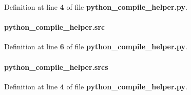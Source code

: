 Definition at line {\bf 4} of file {\bf python\+\_\+compile\+\_\+helper.\+py}.

\paragraph[{src}]{\setlength{\rightskip}{0pt plus 5cm}python\+\_\+compile\+\_\+helper.\+src}\label{namespacepython__compile__helper_afb3a73f20726fb31e2a57e2aee904087}


Definition at line {\bf 6} of file {\bf python\+\_\+compile\+\_\+helper.\+py}.

\paragraph[{srcs}]{\setlength{\rightskip}{0pt plus 5cm}python\+\_\+compile\+\_\+helper.\+srcs}\label{namespacepython__compile__helper_a1f94db0e8e554b34dd181e1d99a84994}


Definition at line {\bf 4} of file {\bf python\+\_\+compile\+\_\+helper.\+py}.

